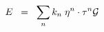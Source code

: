 \begin{equation}
E \;\; = \;\; \sum_{n} k_n \; \eta^n \cdot \tau^{n} {\cal{G}}
\label{eq:x10}
\end{equation}

